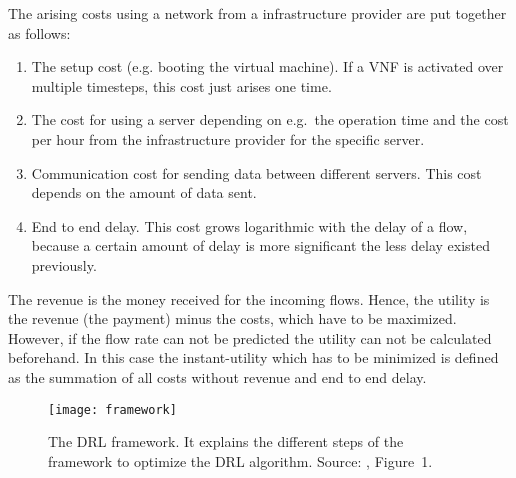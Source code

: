 The arising costs using a network from a infrastructure provider are put together as follows:
\begin{enumerate}
\item The setup cost (e.g. booting the virtual machine). If  a VNF is activated over multiple timesteps, this cost just arises one time.
\item The cost for using a server depending on e.g.~the operation time and the cost per hour from the infrastructure provider for the specific server.

\item Communication cost for sending data between different servers. This cost depends on the amount of data sent.
\item End to end delay. This cost grows logarithmic with the delay of a flow, because a certain amount of delay is more significant the less delay existed previously.
\end{enumerate}
The revenue is the money  received for the incoming flows. Hence, the utility is the revenue (the payment) minus the costs, which have to be maximized. However, if the flow rate can not be predicted the utility can not be calculated beforehand. In this case the instant-utility which has to be minimized is defined as the summation of all costs without revenue and end to end delay.


\begin{figure*}[t]
\label{fig:framework}
\centering
\texttt{[image: framework]}
\caption{The DRL framework. It explains the different steps of the framework to optimize the DRL algorithm. Source: \cite{Gu}, Figure~1.}
\end{figure*}
